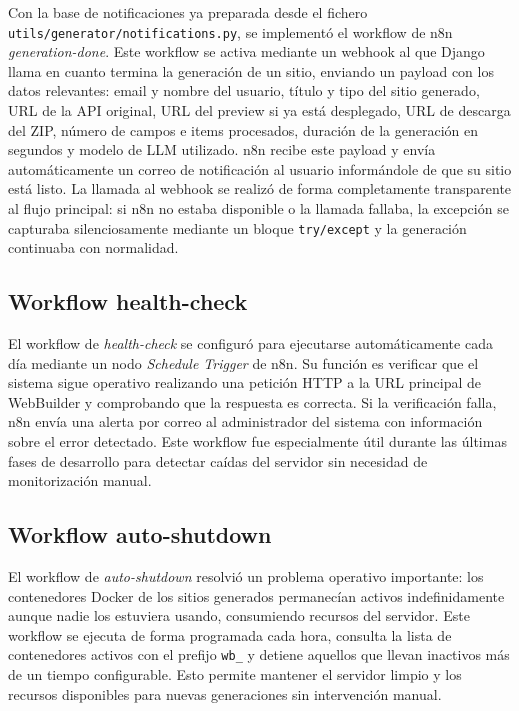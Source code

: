 Con la base de notificaciones ya preparada desde el fichero \\ \texttt{utils/generator/notifications.py}, se implementó el workflow de n8n \emph{generation-done}. Este workflow se activa mediante un webhook al que Django llama en cuanto termina la generación de un sitio, enviando un payload con los datos relevantes: email y nombre del usuario, título y tipo del sitio generado, URL de la API original, URL del preview si ya está desplegado, URL de descarga del ZIP, número de campos e items procesados, duración de la generación en segundos y modelo de LLM utilizado.
n8n recibe este payload y envía automáticamente un correo de notificación al usuario informándole de que su sitio está listo. La llamada al webhook se realizó de forma completamente transparente al flujo principal: si n8n no estaba disponible o la llamada fallaba, la excepción se capturaba silenciosamente mediante un bloque \texttt{try/except} y la generación continuaba con normalidad.


\subsection{Workflow health-check}
\label{subsec:workflow-health-check}

El workflow de \emph{health-check} se configuró para ejecutarse automáticamente cada día mediante un nodo \emph{Schedule Trigger} de n8n. Su función es verificar que el sistema sigue operativo realizando una petición HTTP a la URL principal de WebBuilder y comprobando que la respuesta es correcta. Si la verificación falla, n8n envía una alerta por correo al administrador del sistema con información sobre el error detectado. Este workflow fue especialmente útil durante las últimas fases de desarrollo para detectar caídas del servidor sin necesidad de monitorización manual.


\subsection{Workflow auto-shutdown}
\label{subsec:workflow-auto-shutdown}

El workflow de \emph{auto-shutdown} resolvió un problema operativo importante: los contenedores Docker de los sitios generados permanecían activos indefinidamente aunque nadie los estuviera usando, consumiendo recursos del servidor. Este workflow se ejecuta de forma programada cada hora, consulta la lista de contenedores activos con el prefijo \texttt{wb\_} y detiene aquellos que llevan inactivos más de un tiempo configurable. Esto permite mantener el servidor limpio y los recursos disponibles para nuevas generaciones sin intervención manual.


